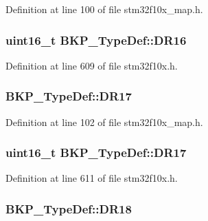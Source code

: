 Definition at line 100 of file stm32f10x\+\_\+map.\+h.

\subsubsection[{\texorpdfstring{D\+R16}{DR16}}]{ {\bf uint16\+\_\+t} B\+K\+P\+\_\+\+Type\+Def\+::\+D\+R16}\hypertarget{struct_b_k_p___type_def_a2824f0970d27bb9edf16075ac54fae23}{}\label{struct_b_k_p___type_def_a2824f0970d27bb9edf16075ac54fae23}


Definition at line 609 of file stm32f10x.\+h.

\subsubsection[{\texorpdfstring{D\+R17}{DR17}}]{ B\+K\+P\+\_\+\+Type\+Def\+::\+D\+R17}\hypertarget{struct_b_k_p___type_def_a5e64d36410ae88ac39062d793d8f63a0}{}\label{struct_b_k_p___type_def_a5e64d36410ae88ac39062d793d8f63a0}


Definition at line 102 of file stm32f10x\+\_\+map.\+h.

\subsubsection[{\texorpdfstring{D\+R17}{DR17}}]{ {\bf uint16\+\_\+t} B\+K\+P\+\_\+\+Type\+Def\+::\+D\+R17}\hypertarget{struct_b_k_p___type_def_a78b37ff2fb91c016b8436f1218b10a4f}{}\label{struct_b_k_p___type_def_a78b37ff2fb91c016b8436f1218b10a4f}


Definition at line 611 of file stm32f10x.\+h.

\subsubsection[{\texorpdfstring{D\+R18}{DR18}}]{ B\+K\+P\+\_\+\+Type\+Def\+::\+D\+R18}\hypertarget{struct_b_k_p___type_def_a31e674d8a81cda2c7f8f5a153b0d0b52}{}\label{struct_b_k_p___type_def_a31e674d8a81cda2c7f8f5a153b0d0b52}


